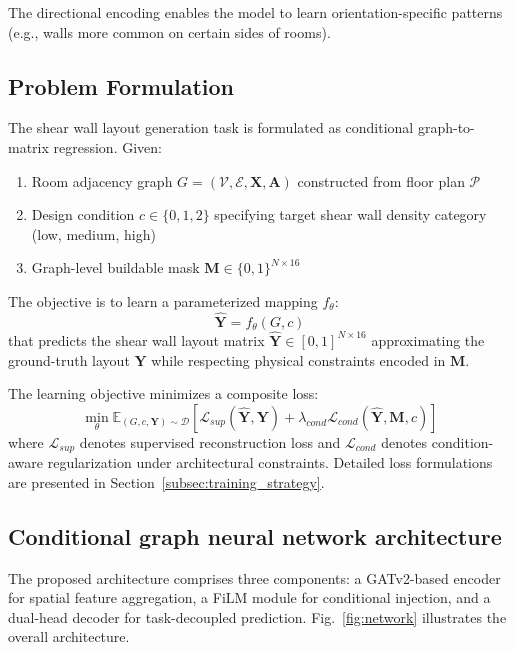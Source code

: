 The directional encoding enables the model to learn orientation-specific patterns (e.g., walls more common on certain sides of rooms).

\subsection{Problem Formulation}
\label{subsec:problem_formulation}

The shear wall layout generation task is formulated as conditional graph-to-matrix regression.
Given:
\begin{enumerate}[(\arabic*)]
\item Room adjacency graph $G = (\mathcal{V}, \mathcal{E}, \mathbf{X}, \mathbf{A})$ constructed from floor plan $\mathcal{P}$
\item Design condition $c \in \{0, 1, 2\}$ specifying target shear wall density category (low, medium, high)
\item Graph-level buildable mask $\mathbf{M} \in \{0,1\}^{N \times 16}$
\end{enumerate}


The objective is to learn a parameterized mapping $f_\theta$:
\begin{equation}
\hat{\mathbf{Y}} = f_\theta(G, c)
\label{eq:method_mapping}
\end{equation}
that predicts the shear wall layout matrix $\hat{\mathbf{Y}} \in [0,1]^{N \times 16}$ approximating the ground-truth layout $\mathbf{Y}$ while respecting physical constraints encoded in $\mathbf{M}$.

The learning objective minimizes a composite loss:
\begin{equation}
\min_\theta \mathbb{E}_{(G, c, \mathbf{Y}) \sim \mathcal{D}} \left[ \mathcal{L}_{sup}(\hat{\mathbf{Y}}, \mathbf{Y}) + \lambda_{cond} \mathcal{L}_{cond}(\hat{\mathbf{Y}}, \mathbf{M}, c) \right]
\label{eq:method_objective}
\end{equation}
where $\mathcal{L}_{sup}$ denotes supervised reconstruction loss and $\mathcal{L}_{cond}$ denotes condition-aware regularization under architectural constraints. Detailed loss formulations are presented in Section~\ref{subsec:training_strategy}.

\subsection{Conditional graph neural network architecture}
\label{subsec:architecture}

The proposed architecture comprises three components: a GATv2-based encoder for spatial feature aggregation, a FiLM module for conditional injection, and a dual-head decoder for task-decoupled prediction.
Fig.~\ref{fig:network} illustrates the overall architecture.

